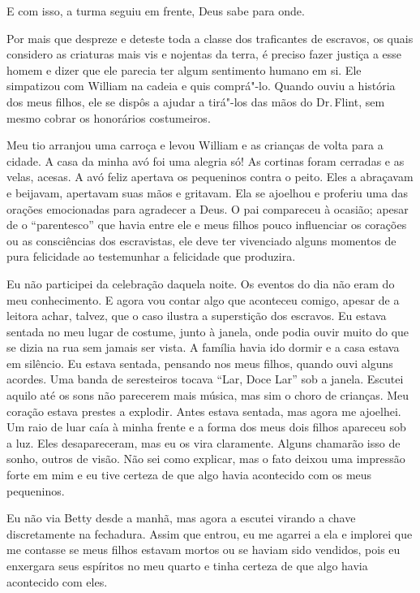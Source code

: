 E com isso, a turma seguiu em frente, Deus sabe para onde.

Por mais que despreze e deteste toda a
classe dos traficantes de escravos, os quais considero as criaturas mais
vis e nojentas da terra, é preciso fazer justiça a esse homem e dizer
que ele parecia ter algum sentimento humano em si. Ele simpatizou com
William na cadeia e quis comprá"-lo. Quando ouviu a história dos meus
filhos, ele se dispôs a ajudar a tirá"-los das mãos do Dr.\,Flint, sem
mesmo cobrar os honorários costumeiros.

Meu tio arranjou uma carroça e levou
William e as crianças de volta para a cidade. A casa da minha avó foi
uma alegria só! As cortinas foram cerradas e as velas, acesas. A avó
feliz apertava os pequeninos contra o peito. Eles a abraçavam e
beijavam, apertavam suas mãos e gritavam. Ela se ajoelhou e proferiu uma
das orações emocionadas para agradecer a Deus. O pai compareceu à
ocasião; apesar de o ``parentesco'' que havia entre ele e meus filhos
pouco influenciar os corações ou as consciências dos escravistas, ele
deve ter vivenciado alguns momentos de pura felicidade ao testemunhar a
felicidade que produzira.

Eu não participei da celebração daquela
noite. Os eventos do dia não eram do meu conhecimento. E agora vou
contar algo que aconteceu comigo, apesar de a leitora achar, talvez, que
o caso ilustra a superstição dos escravos. Eu estava sentada no meu
lugar de costume, junto à janela, onde podia ouvir muito do que se dizia
na rua sem jamais ser vista. A família havia ido dormir e a casa estava
em silêncio. Eu estava sentada, pensando nos meus filhos, quando ouvi
alguns acordes. Uma banda de seresteiros tocava ``Lar, Doce Lar'' sob a
janela. Escutei aquilo até os sons não parecerem mais música, mas sim o
choro de crianças. Meu coração estava prestes a explodir. Antes estava
sentada, mas agora me ajoelhei. Um raio de luar caía à minha frente e a
forma dos meus dois filhos apareceu sob a luz. Eles desapareceram, mas
eu os vira claramente. Alguns chamarão isso de sonho, outros de visão.
Não sei como explicar, mas o fato deixou uma impressão forte em mim e eu
tive certeza de que algo havia acontecido com os meus pequeninos.

Eu não via Betty desde a manhã, mas
agora a escutei virando a chave discretamente na fechadura. Assim que
entrou, eu me agarrei a ela e implorei que me contasse se meus filhos
estavam mortos ou se haviam sido vendidos, pois eu enxergara seus
espíritos no meu quarto e tinha certeza de que algo havia acontecido com
eles.

